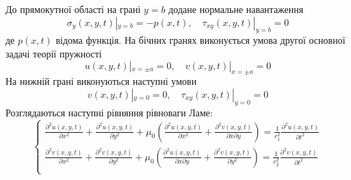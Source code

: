 До прямокутної області на грані $y=b$ додане нормальне навантаження
\begin{equation}
    \sigma_y(x, y, t) |_{y=b} = -p(x, t), \quad  \tau_{xy}(x,y,t) |_{y=b} =0
\end{equation}
де $p(x,t)$ відома функція.
На бічних гранях виконується умова другої основної задачі теорії пружності
\begin{equation}
    u(x,y,t) |_{x=\pm a} = 0, \quad v(x,y,t) |_{x=\pm a} =0
\end{equation}
На нижній грані виконуються наступні умови
\begin{equation}
    v(x,y,t) |_{y=0} = 0, \quad \tau_{xy}(x,y,t) |_{y=0} =0
\end{equation}
Розглядаються наступні рівняння рівноваги Ламе:
\begin{equation}
    \begin{cases}
        \frac{\partial^2 u(x,y,t)}{\partial x^2} + \frac{\partial^2 u(x,y,t)}{\partial y^2} + \mu_0 (\frac{\partial^2 u(x,y,t)}{\partial x^2} + \frac{\partial^2 v(x,y,t)}{\partial x\partial y}) = \frac{1}{c_1^2} \frac{\partial^2 u(x,y,t)}{\partial t^2} \\
        \frac{\partial^2 v(x,y,t)}{\partial x^2} + \frac{\partial^2 v(x,y,t)}{\partial y^2} + \mu_0 (\frac{\partial^2 u(x,y,t)}{\partial x \partial y} + \frac{\partial^2 v(x,y,t)}{\partial y^2}) = \frac{1}{c_2^2} \frac{\partial^2 v(x,y,t)}{\partial t^2} \\
    \end{cases}
\end{equation}

